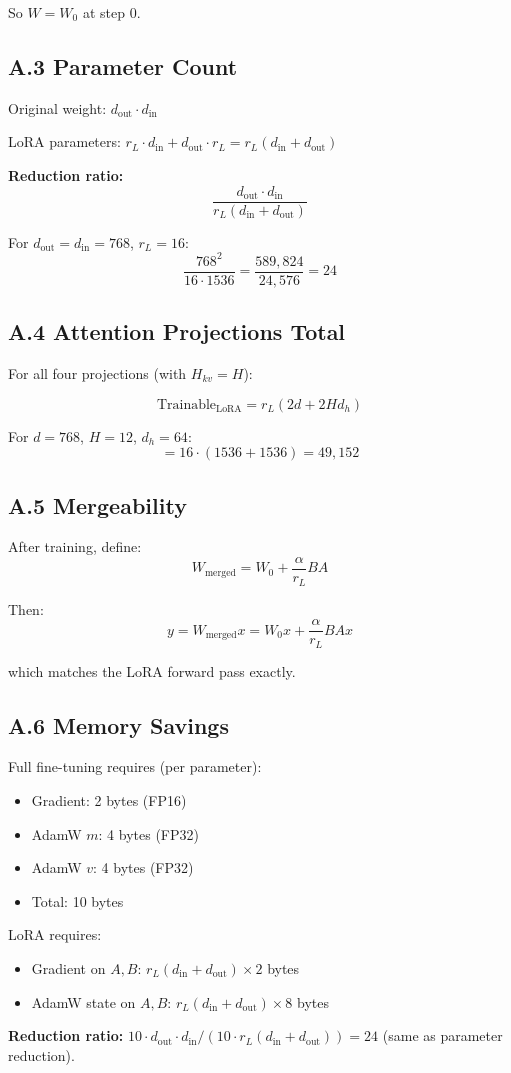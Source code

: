 So $W = W_0$ at step 0.

\subsection{A.3 Parameter Count}

Original weight: $d_\text{out} \cdot d_\text{in}$

LoRA parameters: $r_L \cdot d_\text{in} + d_\text{out} \cdot r_L = r_L (d_\text{in} + d_\text{out})$

\textbf{Reduction ratio:}
\[
\frac{d_\text{out} \cdot d_\text{in}}{r_L (d_\text{in} + d_\text{out})}
\tag{A.3}
\]

For $d_\text{out} = d_\text{in} = 768$, $r_L = 16$:
\[
\frac{768^2}{16 \cdot 1536} = \frac{589,824}{24,576} = 24
\tag{A.4}
\]

\subsection{A.4 Attention Projections Total}

For all four projections (with $H_{kv} = H$):

\[
\text{Trainable}_\text{LoRA} = r_L (2d + 2 H d_h)
\tag{A.5}
\]

For $d = 768$, $H = 12$, $d_h = 64$:
\[
= 16 \cdot (1536 + 1536) = 49,152
\tag{A.6}
\]

\subsection{A.5 Mergeability}

After training, define:
\[
W_\text{merged} = W_0 + \frac{\alpha}{r_L} B A
\tag{A.7}
\]

Then:
\[
y = W_\text{merged} x = W_0 x + \frac{\alpha}{r_L} B A x
\tag{A.8}
\]

which matches the LoRA forward pass exactly.

\subsection{A.6 Memory Savings}

Full fine-tuning requires (per parameter):
\begin{itemize}
\item Gradient: 2 bytes (FP16)
\item AdamW $m$: 4 bytes (FP32)
\item AdamW $v$: 4 bytes (FP32)
\item Total: 10 bytes

\end{itemize}
LoRA requires:
\begin{itemize}
\item Gradient on $A, B$: $r_L(d_\text{in} + d_\text{out}) \times 2$ bytes
\item AdamW state on $A, B$: $r_L(d_\text{in} + d_\text{out}) \times 8$ bytes

\end{itemize}
\textbf{Reduction ratio:} $10 \cdot d_\text{out} \cdot d_\text{in} / (10 \cdot r_L (d_\text{in} + d_\text{out})) = 24$ (same as parameter reduction).

